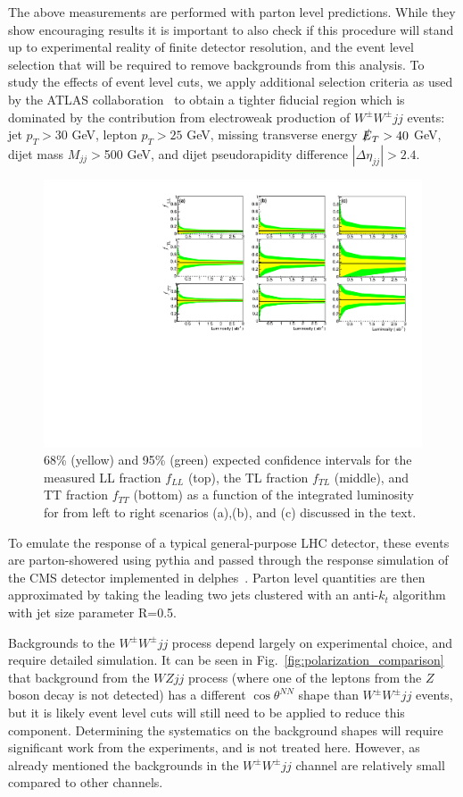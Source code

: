 \documentclass[aps,prl,twocolumn,showpacs,superscriptaddress,groupeaddress,floatfix]{revtex4}
\def\ssWW{\ensuremath{ W^{\pm}W^{\pm}jj }\xspace}
\def\tsNN{\ensuremath{ \theta^{NN} }\xspace}
\def\ctsNN{\ensuremath{ \cos\tsNN }\xspace}
\begin{document}
The above measurements are performed with parton level predictions. While they show encouraging results  it is important 
to also check if this procedure will stand up to experimental reality of finite detector resolution, and the event level selection that
will be required to remove backgrounds from this analysis. To study the effects of event level cuts, we apply additional selection criteria as used by the ATLAS collaboration~\cite{ATLAS_ssWW} to obtain a
tighter fiducial region which is dominated by the contribution from electroweak production of \ssWW events: jet $p_T > 30$ GeV, lepton $p_T > 25$ GeV, missing transverse energy $\slashed{E}_T > 40$ GeV, 
dijet mass $M_{jj} > $500 GeV, and dijet pseudorapidity difference $|\Delta \eta_{jj}| > 2.4 $. 

\begin{figure}
\includegraphics[width=.9\textwidth]{fig_03.pdf}
\caption{ \label{fig:sensitivity} 68\% (yellow) and 95\% (green) expected confidence intervals for the measured LL fraction $f_{LL}$ (top), the TL fraction $f_{TL}$ (middle), and TT fraction $f_{TT}$ (bottom) as a function of the integrated luminosity for from left to right scenarios (a),(b), and (c) discussed in the text.}
\end{figure}


To emulate the response of a typical general-purpose LHC detector, these events are parton-showered using {\sc pythia}\cite{pythia} and passed through the  response simulation of the CMS detector implemented in {\sc delphes}~\cite{delphes}. Parton level quantities are then approximated by taking the leading two jets clustered with an anti-$k_t$ algorithm~\cite{antikt} with jet size parameter R=0.5.


Backgrounds to the \ssWW process depend largely on experimental choice, and require detailed simulation. It can be seen in Fig.~\ref{fig:polarization_comparison} that background from the $WZjj$ process (where one of 
the leptons from the $Z$ boson decay is not detected) has a different \ctsNN shape than \ssWW events, but it is likely event level cuts will still need to be applied to reduce this component. Determining the systematics on the background shapes will require significant work from the experiments, and is not treated here. However, as already mentioned the backgrounds in the \ssWW channel are relatively small compared to other channels.
\end{document}
